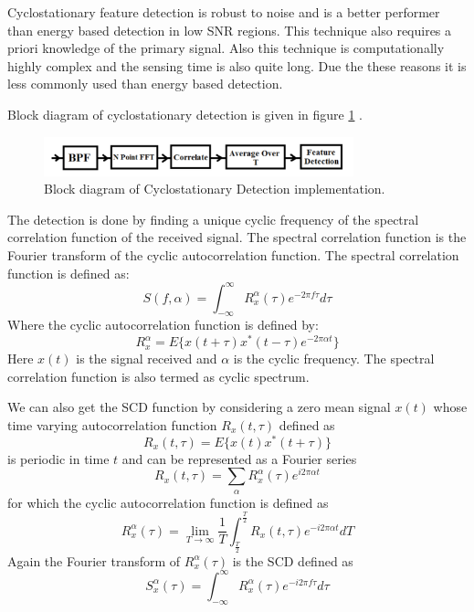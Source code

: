 Cyclostationary feature detection is robust to noise and is a better performer 
than energy based detection in low SNR regions. This technique also requires a 
priori knowledge of the primary signal. Also this technique is computationally 
highly complex and the sensing time is also quite long. Due the these reasons 
it is less commonly used than energy based detection.

Block diagram of cyclostationary detection is given in figure \ref{csd}
\cite{mansi11}.


\begin{figure}[h]
\centering
\includegraphics[width=0.8\textwidth]{../images/csd}
\caption[Cyclostationary Detection implementation]{Block diagram 
of Cyclostationary Detection implementation.}
\label{csd}
\end{figure}
 

The detection is done by finding a unique cyclic frequency of the spectral 
correlation function of the received signal\cite{cabric04}. The spectral correlation 
function is the Fourier transform of the cyclic autocorrelation function. The 
spectral correlation function is defined as:
\begin{equation*}
        S(f,\alpha) = \int_{-\infty}^{\infty} R_{x}^{\alpha}(\tau)e^{-2 \pi f\tau}d\tau 
\end{equation*}
Where the cyclic autocorrelation function is defined by:
\begin{equation*}
    R_{x}^{\alpha} = E\{x(t+\tau)x^{*}(t-\tau)e^{-2 \pi \alpha t}\}
\end{equation*}
Here $x(t)$ is the signal received and $\alpha$ is the cyclic frequency. The spectral 
correlation function is also termed as cyclic spectrum.

We can also get the SCD function by considering a zero mean signal $x(t)$
whose time varying autocorrelation function $R_x(t,\tau)$ defined as
\cite{prithvi11}
\begin{equation*}
    R_{x}(t,\tau) = E\{x(t)x^{\ast}(t+\tau)\}
\end{equation*}
is periodic in time $t$ and can be represented as a Fourier series
\begin{equation*}
    R_{x}(t,\tau) = \sum_{\alpha}R_{x}^{\alpha} (\tau)e^{i2\pi\alpha t} 
\end{equation*}
for which the cyclic autocorrelation function is defined as
\begin{equation*}
    R_{x}^{\alpha}(\tau) = \lim_{T\rightarrow\infty} {\frac{1}{T}}
    \int_{\frac{T}{2}}^{\frac{T}{2}}R_{x}(t,\tau)e^{-i2\pi\alpha t}dT
\end{equation*}
Again the Fourier transform of $R_{x}^{\alpha}(\tau)$ is the SCD defined as
\begin{equation*}
    S_{x}^{\alpha}(\tau)=\int_{-\infty}^{\infty}R_{x}^{\alpha}
    (\tau)e^{-i2\pi f\tau}d\tau
\end{equation*}

